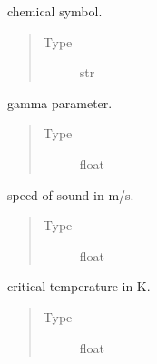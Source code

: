 \documentclass[letterpaper,10pt,english]{sphinxmanual}
\begin{document}
\begin{fulllineitems}
\begin{fulllineitems}
\label{\detokenize{code_structure:scdc.material.Material.symbol}}
chemical symbol.
\begin{quote}\begin{description}
\item[{Type}] \leavevmode
str

\end{description}\end{quote}

\end{fulllineitems}


\begin{fulllineitems}
\label{\detokenize{code_structure:scdc.material.Material.gamma}}
gamma parameter.
\begin{quote}\begin{description}
\item[{Type}] \leavevmode
float

\end{description}\end{quote}

\end{fulllineitems}


\begin{fulllineitems}
\label{\detokenize{code_structure:scdc.material.Material.c_s}}
speed of sound in m/s.
\begin{quote}\begin{description}
\item[{Type}] \leavevmode
float

\end{description}\end{quote}

\end{fulllineitems}


\begin{fulllineitems}
\label{\detokenize{code_structure:scdc.material.Material.T_c}}
critical temperature in K.
\begin{quote}\begin{description}
\item[{Type}] \leavevmode
float


\end{description}
\end{quote}
\end{fulllineitems}
\end{fulllineitems}
\end{document}
